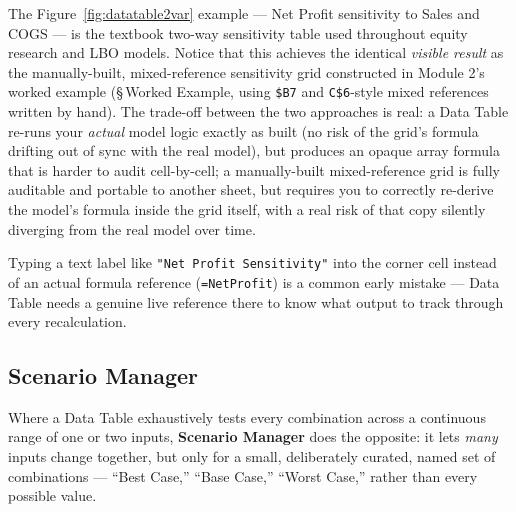 \documentclass[11pt,a4paper]{article}
\begin{document}
\begin{financeapp}
The Figure~\ref{fig:datatable2var} example --- Net Profit sensitivity to Sales and COGS --- is the textbook two-way sensitivity table used throughout equity research and LBO models. Notice that this achieves the identical \emph{visible result} as the manually-built, mixed-reference sensitivity grid constructed in Module 2's worked example (\S\,Worked Example, using \texttt{\$B7} and \texttt{C\$6}-style mixed references written by hand). The trade-off between the two approaches is real: a Data Table re-runs your \emph{actual} model logic exactly as built (no risk of the grid's formula drifting out of sync with the real model), but produces an opaque array formula that is harder to audit cell-by-cell; a manually-built mixed-reference grid is fully auditable and portable to another sheet, but requires you to correctly re-derive the model's formula inside the grid itself, with a real risk of that copy silently diverging from the real model over time.
\end{financeapp}

\begin{pitfall}
Typing a text label like \texttt{"Net Profit Sensitivity"} into the corner cell instead of an actual formula reference (\texttt{=NetProfit}) is a common early mistake --- Data Table needs a genuine live reference there to know what output to track through every recalculation.
\end{pitfall}

\subsection{Scenario Manager}
\label{sec:scenariomanager}

Where a Data Table exhaustively tests every combination across a continuous range of one or two inputs, \textbf{Scenario Manager} does the opposite: it lets \emph{many} inputs change together, but only for a small, deliberately curated, named set of combinations --- ``Best Case,'' ``Base Case,'' ``Worst Case,'' rather than every possible value.
\end{document}
